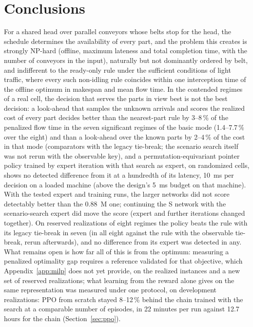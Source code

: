 \documentclass[11pt,a4paper]{article}
\theoremstyle{plain}
\theoremstyle{definition}
\theoremstyle{remark}
\begin{document}
\section{Conclusions}
For a shared head over parallel conveyors whose belts stop for the head, the schedule
determines the availability of every part, and the problem this creates is strongly
NP-hard (offline, maximum lateness and total completion time, with the number of conveyors
in the input), naturally but not dominantly ordered by belt, and indifferent to the ready-only
rule under the sufficient conditions of light traffic, where every such non-idling rule
coincides within one interception time of the offline optimum in makespan and mean flow
time. In the contended regimes of a real cell, the decision that
serves the parts in view best is not the best decision: a look-ahead that samples the
unknown arrivals and scores the realized cost of every part decides better than the
nearest-part rule by 3--8\,\% of the penalized flow time in the seven significant regimes
of the basic mode (1.4--7.7\,\% over the eight) and than a look-ahead over the
known parts by 2--4\,\% of the cost in that mode (comparators with the legacy tie-break;
the scenario search itself was not rerun with the observable key), and a permutation-equivariant pointer policy trained by expert
iteration with that search as expert, on randomized cells, shows no detected difference
from it at a hundredth of its latency, 10~ms per decision on a loaded machine (above
the design's 5~ms budget on that machine). With the
tested expert and training runs, the larger networks did not score detectably better than the
0.88~M one; continuing the S network with the scenario-search expert did move the score
(expert and further iterations changed together). On reserved
realizations of eight regimes the policy beats the rule with its legacy tie-break in seven
(in all eight against the rule with the observable tie-break, rerun afterwards), and no difference
from its expert was detected in any. What remains open is how far all of this is
from the optimum: measuring a penalized optimality gap requires a reference validated
for that objective, which Appendix~\ref{app:milp} does not yet provide, on the realized
instances and a new set of reserved realizations; what learning from the reward
alone gives on the same representation was measured under one protocol, on development
realizations: PPO from scratch stayed 8--12\,\% behind the chain trained with the search
at a comparable number of episodes, in 22 minutes per run against 12.7 hours for the
chain (Section~\ref{sec:ppo}).
\end{document}
